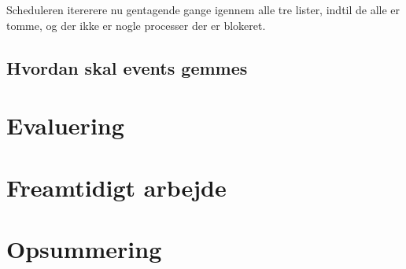 Scheduleren itererere nu gentagende gange igennem alle tre lister, indtil de alle er tomme, og der ikke er nogle processer der er blokeret. 

 
    \subsection{Hvordan skal events gemmes}
    
  \section{Evaluering}
  \section{Freamtidigt arbejde}
  \section{Opsummering}
